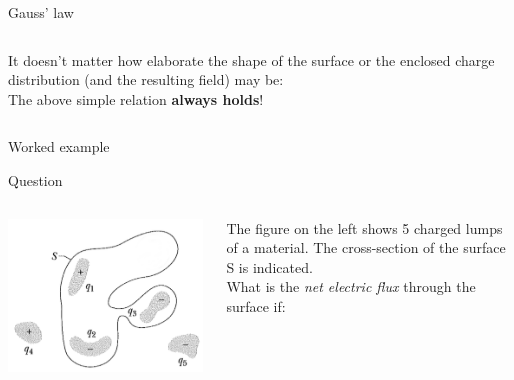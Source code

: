 \begin{frame}{Gauss' law}
\begin{columns}
\begin{column}{0.67\textwidth}
      It doesn't matter how elaborate the shape of the surface or the enclosed
      charge distribution (and the resulting field) may be:\\
      The above simple relation {\bf always holds}!\\
  \end{column}
\end{columns}
\end{frame}


%
%

{
\problemslide

%
%
%

\begin{frame}{Worked example}

  \begin{blockexmplque}{Question}
    \begin{columns}
      \begin{column}{0.40\textwidth}
        \begin{center}
          \includegraphics[width=0.99\textwidth]{./images/problems/lect02_enclosed_charges.png}\\
        \end{center}
      \end{column}
      \begin{column}{0.60\textwidth}
        The figure on the left shows 5 charged lumps of a material.
        The cross-section of the surface S is indicated.\\
        What is the {\em net electric flux} through the surface if:\\

\end{column}
\end{columns}
\end{blockexmplque}
\end{frame}}
